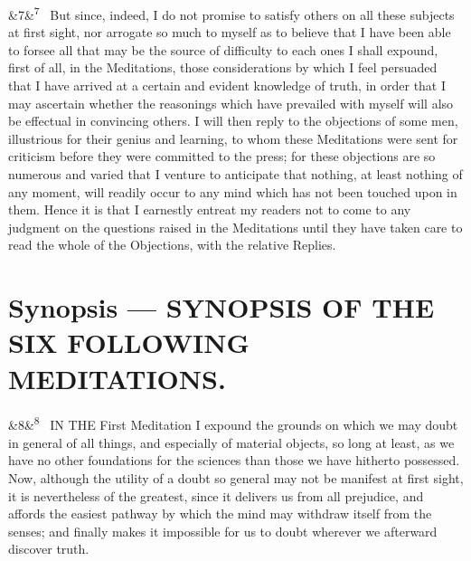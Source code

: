 \documentclass[12pt]{article}
\newcommand{\para}[1][]{\par\noindent\ifx&#1&\else\textsuperscript{\footnotesize #1}~\fi}
\begin{document}
\para[7] But since, indeed, I do not promise to satisfy others on all these subjects at first sight, nor arrogate so much to myself as to believe that I have been able to forsee all that may be the source of difficulty to each ones I shall expound, first of all, in the Meditations, those considerations by which I feel persuaded that I have arrived at a certain and evident knowledge of truth, in order that I may ascertain whether the reasonings which have prevailed with myself will also be effectual in convincing others. I will then reply to the objections of some men, illustrious for their genius and learning, to whom these Meditations were sent for criticism before they were committed to the press; for these objections are so numerous and varied that I venture to anticipate that nothing, at least nothing of any moment, will readily occur to any mind which has not been touched upon in them. Hence it is that I earnestly entreat my readers not to come to any judgment on the questions raised in the Meditations until they have taken care to read the whole of the Objections, with the relative Replies.

\section*{Synopsis --- SYNOPSIS OF THE SIX FOLLOWING MEDITATIONS.}

\para[8] IN THE First Meditation I expound the grounds on which we may doubt in general of all things, and especially of material objects, so long at least, as we have no other foundations for the sciences than those we have hitherto possessed. Now, although the utility of a doubt so general may not be manifest at first sight, it is nevertheless of the greatest, since it delivers us from all prejudice, and affords the easiest pathway by which the mind may withdraw itself from the senses; and finally makes it impossible for us to doubt wherever we afterward discover truth.
\end{document}
